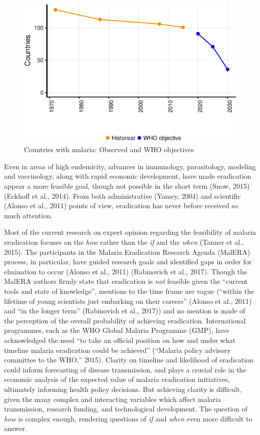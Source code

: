 \documentclass[]{article}
\begin{document}
\begin{figure}[h]

{\centering \includegraphics{paper_files/figure-latex/unnamed-chunk-3-1} 

}

\caption{Countries with malaria: Observed and WHO objectives}\label{fig:unnamed-chunk-3}
\end{figure}

Even in areas of high endemicity, advances in immunology, parasitology,
modeling and vaccinology, along with rapid economic development, have
made eradication appear a more feasible goal, though not possible in the
short term (Snow, 2015) (Eckhoff et al., 2014). From both administrative
(Yamey, 2004) and scientific (Alonso et al., 2011) points of view,
eradication has never before received so much attention.

Most of the current research on expert opinion regarding the feasibility
of malaria eradication focuses on the \emph{how} rather than the
\emph{if} and the \emph{when} (Tanner et al., 2015). The participants in
the Malaria Eradication Research Agenda (MalERA) process, in particular,
have guided research goals and identified gaps in order for elmination
to occur (Alonso et al., 2011) (Rabinovich et al., 2017). Though the
MalERA authors firmly state that eradication is \emph{not} feasible
given the ``current tools and state of knowledge'', mentions to the time
frame are vague (``within the lifetime of young scientists just
embarking on their careers'' (Alonso et al., 2011) and ``in the longer
term'' (Rabinovich et al., 2017)) and no mention is made of the
perception of the overall probability of achieving eradication.
International programmes, such as the WHO Global Malaria Programme
(GMP), have acknowledged the need ``to take an official position on how
and under what timeline malaria eradication could be achieved''
(``Malaria policy advisory committee to the WHO,'' 2015). Clarity on
timeline and likelihood of eradication could inform forecasting of
disease transmission, and plays a crucial role in the economic analysis
of the expected value of malaria eradication initiatives, ultimately
informing health policy decisions. But achieving clarity is difficult,
given the many complex and interacting variables which affect malaria
transmission, research funding, and technological development. The
question of \emph{how} is complex enough, rendering questions of
\emph{if} and \emph{when} even more difficult to answer.
\end{document}
